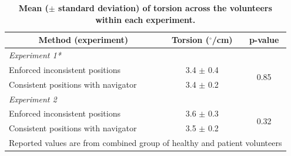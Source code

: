 	\begin{table}
		\centering
		\caption[Mean ($\pm$ standard deviation) of torsion across the volunteers within each experiment]{\textbf{Mean ($\pm$ standard deviation) of torsion across the volunteers within each experiment.}}
		\label{table:torsion}
		\begin{tabular}{c  c  c}
			\toprule
			\multicolumn{1}{c}{\textbf{Method (experiment)}}       			& \multicolumn{1}{c}{\textbf{Torsion ($^{\circ}$/cm)}} & \multicolumn{1}{c}{\textbf{p-value}} \\ \midrule
			\multicolumn{1}{l}{\textit{Experiment 1*}}                      & \multicolumn{1}{c}{}                          &                                     \\
			\multicolumn{1}{l}{\qquad Enforced inconsistent positions}      & \multicolumn{1}{c}{3.4 $\pm$ 0.4}             & \multirow{2}{*}{0.85}                     \\
			\multicolumn{1}{l}{\qquad Consistent positions with navigator}  & \multicolumn{1}{c}{3.4 $\pm$ 0.2}             &                                             \\
			\multicolumn{1}{l}{\textit{Experiment 2}}                       & \multicolumn{1}{c}{}                          &                				      \\
			\multicolumn{1}{l}{\qquad Enforced inconsistent positions}      & \multicolumn{1}{c}{3.6 $\pm$ 0.3}             & \multirow{2}{*}{0.32}                \\
			\multicolumn{1}{l}{\qquad Consistent positions with navigator}  & \multicolumn{1}{c}{3.5 $\pm$ 0.2}             &                                       	  \\
			\bottomrule
			\multicolumn{3}{l}{\footnotesize*Reported values are from combined group of healthy and patient volunteers}                                                   
		\end{tabular}
	\end{table}

